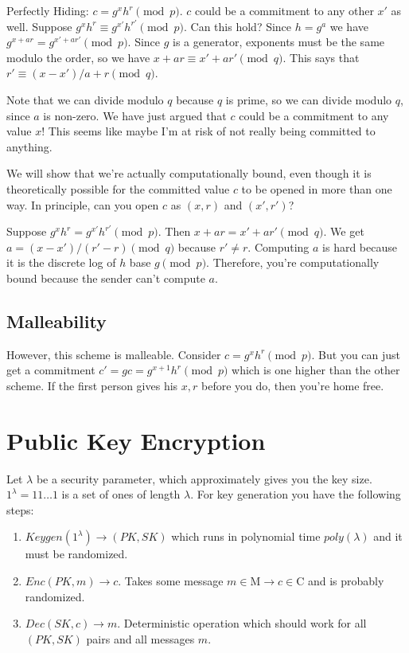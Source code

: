 \documentclass[psamsfonts]{amsart}
\begin{document}
Perfectly Hiding: $c = g^x h^r \pmod{p}$. $c$ could be a commitment to any other $x'$ as well. Suppose $g^x h^r \equiv g^{x'} h^{r'} \pmod{p}$. Can this hold? Since $h = g^a$ we have $g^{x + ar} = g^{x' + ar'} \pmod{p}$. Since $g$ is a generator, exponents must be the same modulo the order, so we have $x+ar \equiv x' + ar' \pmod{q}$. This says that $r' \equiv (x - x')/a + r \pmod{q}$.

Note that we can divide modulo $q$ because $q$ is prime, so we can divide modulo $q$, since $a$ is non-zero. We have just argued that $c$ could be a commitment to any value $x$! This seems like maybe I'm at risk of not really being committed to anything.

We will show that we're actually computationally bound, even though it is theoretically possible for the committed value $c$ to be opened in more than one way. In principle, can you open $c$ as $(x,r)$ and $(x', r')$?

Suppose $g^x h^r = g^{x'} h^{r'} \pmod{p}$. Then $x + ar = x' + ar' \pmod{q}$. We get $a = (x - x')/(r' - r) \pmod{q}$ because $r' \neq r$. Computing $a$ is hard because it is the discrete log of $h$ base $g \pmod{p}$. Therefore, you're computationally bound because the sender can't compute $a$. 

\subsection{Malleability}

However, this scheme is malleable. Consider $c = g^x h^r \pmod{p}$. But you can just get a commitment $c' = g c = g^{x+1} h^r \pmod{p}$ which is one higher than the other scheme. If the first person gives his $x,r$ before you do, then you're home free.

\section{Public Key Encryption}

Let $\lambda$ be a security parameter, which approximately gives you the key size. $1^{\lambda} = 1 1 \ldots 1$ is a set of ones of length $\lambda$. For key generation you have the following steps:

\begin{enumerate}
  \item $Keygen(1^{\lambda}) \to (PK, SK)$ which runs in polynomial time $poly(\lambda)$ and it must be randomized.
  \item $Enc(PK, m) \to c$. Takes some message $m \in \mathrm{M} \to c \in \mathrm{C}$ and is probably randomized.
  \item $Dec(SK, c) \to m$. Deterministic operation which should work for all $(PK, SK)$ pairs and all messages $m$. 
\end{enumerate}
\end{document}
